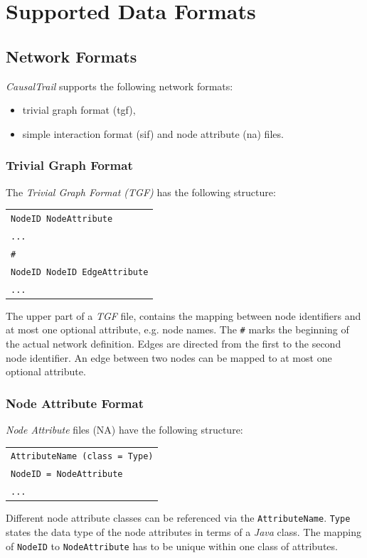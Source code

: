 \section{Supported Data Formats}
\subsection{Network Formats}
\textit{CausalTrail} supports the following network formats:
\begin{itemize}
 \item trivial graph format (tgf),
 \item simple interaction format (sif) and node attribute (na) files.
\end{itemize}

\subsubsection{Trivial Graph Format}
\label{subsection:tgf}
The \textit{Trivial Graph Format (TGF)} has the following structure:
\begin{center}
 \begin{tabular}{l}
	\texttt{NodeID	NodeAttribute}
	\\\texttt{...}
  	\\\texttt{\#}
    \\\texttt{NodeID	NodeID	EdgeAttribute}
	\\\texttt{...}
 \end{tabular}
\end{center}
The upper part of a \textit{TGF} file, contains the mapping between node identifiers and at most one optional attribute, e.g. node names. 
The \texttt{\#} marks the beginning of the actual network definition. Edges are directed from the first to the second node identifier.
An edge between two nodes can be mapped to at most one optional attribute.

\subsubsection{Node Attribute Format}
\label{subsection:na}
\textit{Node Attribute} files (NA) have the following structure:
\begin{center}
\begin{tabular}{l}
    \texttt{AttributeName (class	=	Type)}
    \\\texttt{NodeID	=	NodeAttribute}
    \\\texttt{...}
\end{tabular}
\end{center}
\noindent
Different node attribute classes can be referenced via the \texttt{AttributeName}. \texttt{Type} states the data type
of the node attributes in terms of a \textit{Java} class. The mapping of \texttt{NodeID} to \texttt{NodeAttribute} has to be unique within one class of attributes.

